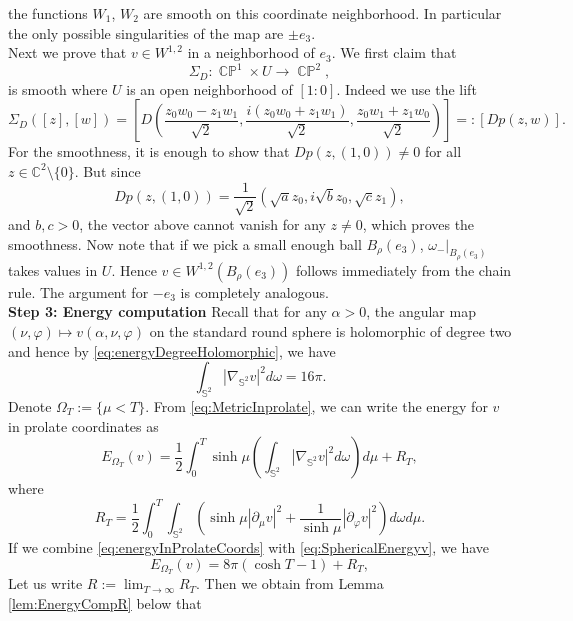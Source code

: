 \documentclass[11pt]{article}
\theoremstyle{plain}
\numberwithin{equation}{section}
\theoremstyle{definition}
\let\oldendproof\endproof
\renewenvironment{proof}[1][\proofname]{%
\oldproof[\upshape \bfseries #1]%
}{\oldendproof}
\def \C{\mathbb{C}}
\def \p{\partial}
\def \mb{\mathbb}
\newcommand{\Om}{\Omega}
\DeclareMathOperator{\CP}{\mathbb{CP}}
\begin{document}
\begin{proof}[Proof of Proposition \ref{prop:step3}]
\[    \]
    the functions $W_1$, $W_2$ are smooth on this coordinate neighborhood. In particular the only possible singularities of the map are $\pm e_3$.\\
    Next we prove that $v \in W^{1,2}$ in a neighborhood of $e_3$. We first claim that
    \[
    \Sigma_D:\CP^1 \times U \to \CP^2,
    \]
    is smooth where $U$ is an open neighborhood of $[1:0]$. Indeed we use the lift
    \[
    \Sigma_D([z],[w])=\left[
D\left(
\frac{z_0w_0-z_1w_1}{\sqrt{2}},
\frac{i(z_0w_0+z_1w_1)}{\sqrt{2}},
\frac{z_0w_1+z_1w_0}{\sqrt{2}}
\right)
\right]=:[Dp(z,w)].
    \]
    For the smoothness, it is enough to show that $Dp(z,(1,0))\neq 0$ for all $z \in \C^2\setminus\{0\}$. But since
    \[
    Dp(z,(1,0))=\frac{1}{\sqrt{2}}(\sqrt{a}z_0,i\sqrt{b}z_0,\sqrt{c}z_1),
    \]
    and $b,c>0$, the vector above cannot vanish for any $z\neq0$, which proves the smoothness. Now note that if we pick a small enough ball $B_\rho(e_3)$, $\omega_-|_{B_{\rho}(e_3)}$ takes values in $U$. Hence $v \in W^{1,2}(B_{\rho}(e_3))$ follows immediately from the chain rule. The argument for $-e_3$ is completely analogous.\\
    \textbf{Step 3: Energy computation} 
    Recall that for any $\alpha>0$, the angular map $(\nu,\varphi)\mapsto v(\alpha,\nu,\varphi)$ on the standard round sphere is holomorphic of degree two and hence by \eqref{eq:energyDegreeHolomorphic}, we have
    \begin{equation}
        \label{eq:SphericalEnergyv}
        \int_{\mb S^2}|\nabla_{\mb S^2}v|^2d\omega =16\pi.
    \end{equation}
    Denote $\Omega_T:=\{\mu < T\}$. From \eqref{eq:MetricInprolate}, we can write the energy for $v$ in prolate coordinates as
    \begin{equation}
        \label{eq:energyInProlateCoords}
        E_{\Om_T}(v)=\frac{1}{2}\int_0^T\sinh\mu\left(\int_{\mb S^2}|\nabla_{\mb S^2}v|^2d\omega\right)d\mu +R_T,
    \end{equation}
    where
    \[
    R_T=\frac12\int_{0}^T\int_{\mb S^2}\left(\sinh \mu|\p_\mu v|^2+\frac{1}{\sinh\mu}|\partial_{\varphi}v|^2\right)d\omega d\mu.
    \]
    If we combine \eqref{eq:energyInProlateCoords} with \eqref{eq:SphericalEnergyv}, we have
    \begin{equation}
        \label{energyofvinEllipsoid}
        E_{\Om_T}(v)=8\pi(\cosh T-1)+R_T,
    \end{equation}
    Let us write $R:=\lim_{T \to \infty}R_T$. Then we obtain from Lemma \ref{lem:EnergyCompR} below that
    \begin{equation}

\end{equation}
\end{proof}
\end{document}
